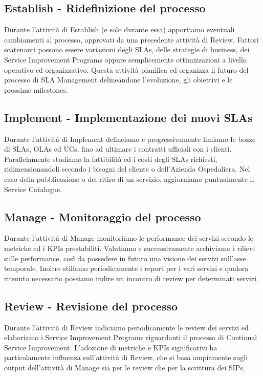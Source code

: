 \subsection{Establish - Ridefinizione del processo}

Durante l'attività di Establish (e solo durante essa) apportiamo eventuali cambiamenti al processo, approvati da una precedente attività di Review. Fattori scatenanti possono essere variazioni degli SLAs, delle strategie di business, dei Service Improvement Programs oppure semplicemente ottimizzazioni a livello operativo ed organizzativo. Questa attività pianifica ed organizza il futuro del processo di SLA Management delineandone l'evoluzione, gli obiettivi e le prossime milestones.

\subsection{Implement - Implementazione dei nuovi SLAs}

Durante l'attività di Implement delineiamo e progressivamente limiamo le bozze di SLAs, OLAs ed UCs, fino ad ultimare i contratti ufficiali con i clienti. Parallelamente studiamo la fattibilità ed i costi degli SLAs richiesti, ridimensionandoli secondo i bisogni del cliente o dell'Azienda Ospedaliera. Nel caso della pubblicazione o del ritiro di un servizio, aggiorniamo puntualmente il Service Catalogue.


\subsection{Manage - Monitoraggio del processo}

Durante l'attività di Manage monitoriamo le performance dei servizi secondo le metriche ed i KPIs prestabiliti. Valutiamo e successivamente archiviamo i rilievi sulle performance, così da possedere in futuro una visione dei servizi sull'asse temporale. Inoltre stiliamo periodicamente i report per i vari servizi e qualora ritenuto necessario possiamo indire un incontro di review per determinati servizi.


\subsection{Review - Revisione del processo}

Durante l'attività di Review indiciamo periodicamente le review dei servizi ed elaboriamo i Service Improvement Programs riguardanti il processo di Continual Service Improvement. L'adozione di metriche e KPIs significativi ha particolamente influenza sull'attività di Review, che si basa ampiamente sugli output dell'attività di Manage sia per le review che per la scrittura dei SIPs.


